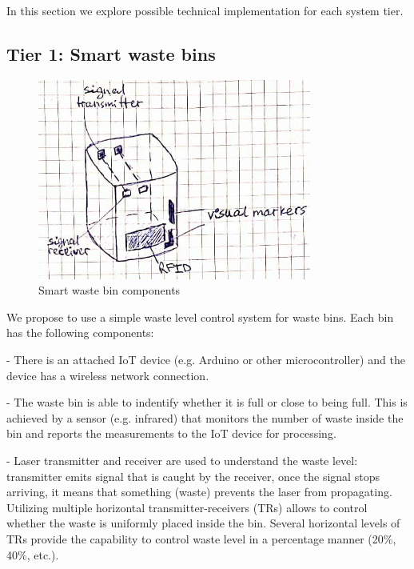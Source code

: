 \documentclass{article}
\begin{document}

In this section we explore possible technical implementation for each system tier.

\subsection{Tier 1: Smart waste bins}

\begin{figure}[ht!]
\centering
\includegraphics[width=90mm]{./waste_bin.jpg}
\caption{Smart waste bin components}
\end{figure}

We propose to use a simple waste level control system for waste bins. Each bin has the following
components:

- There is an attached IoT device (e.g. Arduino or other microcontroller) and the device has a
wireless network connection.

- The waste bin is able to indentify whether it is full or close to being full. This is achieved by
a sensor (e.g. infrared) that monitors the number of waste inside the bin and reports the
measurements to the IoT device for processing.

- Laser transmitter and receiver are used to understand the waste level: transmitter emits signal
that is caught by the receiver, once the signal stops arriving, it means that something (waste)
prevents the laser from propagating. Utilizing multiple horizontal transmitter-receivers (TRs)
allows to control whether the waste is uniformly placed inside the bin. Several horizontal levels of
TRs provide the capability to control waste level in a percentage manner (20\%, 40\%, etc.).
\end{document}
